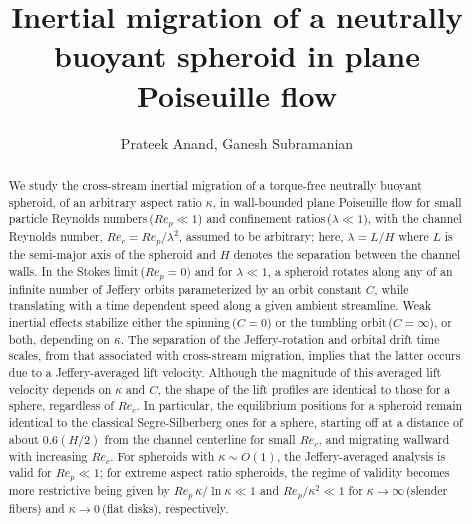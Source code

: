 \documentclass{jfm}
\title{Inertial migration of a neutrally buoyant spheroid in plane Poiseuille flow}
\author{Prateek Anand\aff{1}, Ganesh Subramanian\aff{1}
	\corresp{\email{sganesh@jncasr.ac.in}}}
\affiliation{\aff{1}Engineering Mechanics Unit, Jawaharlal Nehru Centre for Advanced Scientific Research, Bengaluru-560064, India.}
\begin{document}
\maketitle
	\begin{abstract}
 We study the cross-stream inertial migration of a torque-free neutrally buoyant spheroid, of an arbitrary aspect ratio $\kappa$, in wall-bounded plane Poiseuille flow for small particle Reynolds numbers\,($Re_p\ll1$) and confinement ratios\,($\lambda\ll1$), with the channel Reynolds number, $Re_c = Re_p/\lambda^2$, assumed to be arbitrary; here, $\lambda=L/H$ where $L$ is the semi-major axis of the spheroid and $H$ denotes the separation between the channel walls. In the Stokes limit\,($Re_p =0)$ and for $\lambda \ll 1$, a spheroid rotates along any of an infinite number of Jeffery orbits parameterized by an orbit constant $C$, while translating with a time dependent speed along a given ambient streamline. Weak inertial effects stabilize either the spinning\,($C=0$) or the tumbling orbit\,($C=\infty$), or both, depending on $\kappa$. The separation of the Jeffery-rotation and orbital drift time scales, from that associated with cross-stream migration, implies that the latter occurs due to a Jeffery-averaged lift velocity. Although the magnitude of this averaged lift velocity depends on $\kappa$ and $C$, the shape of the lift profiles are identical to those for a sphere, regardless of $Re_c$. In particular, the equilibrium positions for a spheroid remain identical to the classical Segre-Silberberg ones for a sphere, starting off at a distance of about $0.6(H/2)$ from the channel centerline for small $Re_c$, and migrating wallward with increasing $Re_c$. For spheroids with $\kappa \sim O(1)$, the Jeffery-averaged analysis is valid for $Re_p\ll1$; for extreme aspect ratio spheroids, the regime of validity becomes more restrictive being given by $Re_p\,\kappa/\ln \kappa \ll 1$ and $Re_p/\kappa^2 \ll 1$ for $\kappa \rightarrow \infty$\,(slender fibers) and $\kappa \rightarrow 0$\,(flat disks), respectively.
	\end{abstract}

	\begin{keywords}
	\end{keywords}
\end{document}
